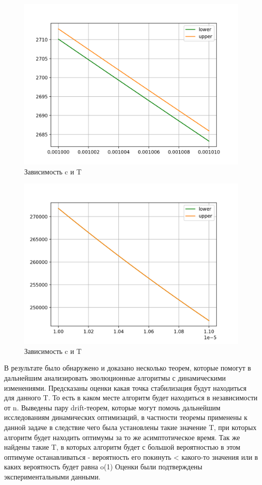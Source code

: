 \documentclass[times,specification,annotation]{itmo-student-thesis}
\begin{document}
    \begin{figure}[H]
        \centering
        \caption{Зависимость c и T}
        \label{pic:sublists-metafile}
        \includegraphics[scale=0.8]{kf_0001_00101.png}
    \end{figure}
    \begin{figure}[H]
        \centering
        \caption{Зависимость c и T}
        \label{pic:sublists-metafile}
        \includegraphics[scale=0.8]{kf_00001_000011.png}
    \end{figure}

    \startconclusionpage
    В результате было обнаружено и доказано несколько теорем, которые помогут в дальнейшим анализировать эволюционные алгоритмы с динамическими изменениями.
    Предсказаны оценки какая точка стабилизация будут находиться для данного T. То есть в каком месте алгоритм будет находиться в независимости от n.
    Выведены пару drift-теорем, которые могут помочь дальнейшим исследованиям динамических оптимизаций, в частности теоремы применены к данной задаче в следствие чего была установлены такие значение T, при которых алгоритм будет находить оптимумы за то же асимптотическое время.
    Так же найдены такие T, в которых алгоритм будет с большой вероятностью в этом оптимуме останавливаться - вероятность его покинуть < какого-то значения или в каких вероятность будет равна o(1)
    Оценки были подтверждены экспериментальными данными.
    \printmainbibliography
\end{document}
